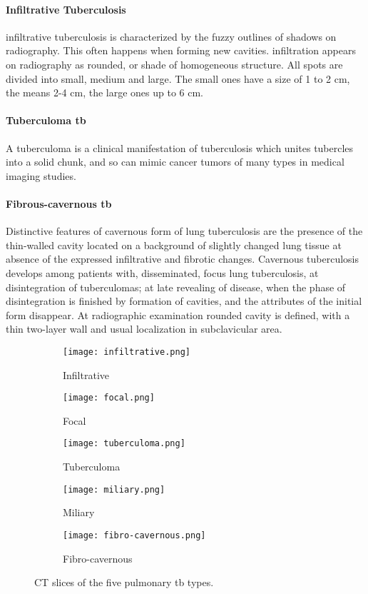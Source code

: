 \paragraph{Infiltrative Tuberculosis}
infiltrative tuberculosis is characterized by the fuzzy outlines of shadows on radiography. This often happens when forming new cavities. infiltration appears on radiography as rounded, or shade of homogeneous structure. All spots are divided into small, medium and large. The small ones have a size of 1 to 2 cm, the means 2-4 cm, the large ones up to 6 cm.\cite{TBINF:1}
\paragraph{Tuberculoma \ac{tb}}
A tuberculoma is a clinical manifestation of tuberculosis which unites tubercles into a solid chunk, and so can mimic cancer tumors of many types in medical imaging studies.\cite{TBTUM:1,TBTUM:2}
\paragraph{Fibrous-cavernous \ac{tb}}
Distinctive features of cavernous form of lung tuberculosis are the presence of the thin-walled cavity located on a background of slightly changed lung tissue at absence of the expressed infiltrative and fibrotic changes. Cavernous tuberculosis develops among patients with, disseminated, focus lung tuberculosis, at disintegration of tuberculomas; at late revealing of disease, when the phase of disintegration is finished by formation of cavities, and the attributes of the initial form disappear. At radiographic examination rounded cavity is defined, with a thin two-layer wall and usual localization in subclavicular area.\cite{TBFIB:1}
\begin{figure}[h!]
  \centering
  \begin{subfigure}[b]{0.3\linewidth}
    \texttt{[image: infiltrative.png]}
    \caption{Infiltrative}
  \end{subfigure}
  \begin{subfigure}[b]{0.3\linewidth}
    \texttt{[image: focal.png]}
    \caption{Focal}
  \end{subfigure}
  \begin{subfigure}[b]{0.3\linewidth}
    \texttt{[image: tuberculoma.png]}
    \caption{Tuberculoma}
  \end{subfigure}
  \begin{subfigure}[b]{0.3\linewidth}
    \texttt{[image: miliary.png]}
    \caption{Miliary}
  \end{subfigure}
  \begin{subfigure}[b]{0.3\linewidth}
    \texttt{[image: fibro-cavernous.png]}
    \caption{Fibro-cavernous}
  \end{subfigure}
  
  \caption{CT slices of the five pulmonary \ac{tb} types.\cite{ImageCLEF:1}}
  \label{fig:tb_types}
\end{figure}

